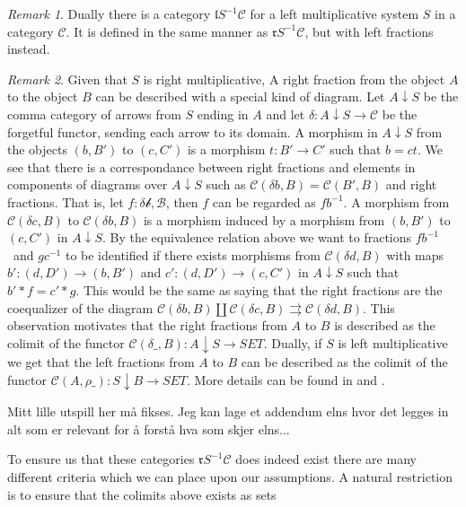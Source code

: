 \documentclass[12pt]{article}
\theoremstyle{definition}
\theoremstyle{remark}
\newtheorem*{remark}{Remark}
\begin{document}
            \begin{remark}
                Dually there is a category $\mathfrak{l}S^{-1}\mathcal{C}$ for a left multiplicative system $S$ in a category $\mathcal{C}$. It is defined in the same manner as $\mathfrak{r}S^{-1}\mathcal{C}$, but with left fractions instead.
            \end{remark}

            \begin{remark}
                Given that $S$ is right multiplicative, A right fraction from the object $A$ to the object $B$ can be described with a special kind of diagram. Let $A\downarrow S$ be the comma category of arrows from $S$ ending in $A$ and let $\delta : A\downarrow S\rightarrow\mathcal{C}$ be the forgetful functor, sending each arrow to its domain. A morphism in $A\downarrow S$ from the objects $(b,B')$ to $(c,C')$ is a morphism $t : B'\rightarrow C'$ such that $b=ct$. We see that there is a correspondance between right fractions and elements in components of diagrams over $A\downarrow S$ such as $\mathcal{C}(\delta b, B)=\mathcal{C}(B',B)$ and right fractions. That is, let $f:\mathcal{\delta b, B}$, then $f$ can be regarded as $fb^{-1}$. A morphism from $\mathcal{C}(\delta c, B)$ to $\mathcal{C}(\delta b, B)$ is a morphism induced by a morphism from $(b,B')$ to $(c,C')$ in $A\downarrow S$. By the equivalence relation above we want to fractions $fb^{-1}$ and $gc^{-1}$ to be identified if there exists morphisms from $\mathcal{C}(\delta d, B)$ with maps $b' : (d,D')\rightarrow (b,B')$ and $c' : (d,D')\rightarrow (c,C')$ in $A\downarrow S$ such that $b'*f = c'*g$. This would be the same as saying that the right fractions are the coequalizer of the diagram $\mathcal{C}(\delta b, B)\coprod \mathcal{C}(\delta c, B)\rightrightarrows \mathcal{C}(\delta d, B)$. This observation motivates that the right fractions from $A$ to $B$ is described as the colimit of the functor $\mathcal{C}(\delta\_, B):A\downarrow S\rightarrow SET$. Dually, if $S$ is left multiplicative we get that the left fractions from $A$ to $B$ can be described as the colimit of the functor $\mathcal{C}(A, \rho\_):S\downarrow B\rightarrow SET$. More details can be found in \cite{zisman} and \cite{weibel}.
            \end{remark}

            Mitt lille utspill her må fikses. Jeg kan lage et addendum elns hvor det legges in alt som er relevant for å forstå hva som skjer elns...

            To ensure us that these categories $\mathfrak{r}S^{-1}\mathcal{C}$ does indeed exist there are many different criteria which we can place upon our assumptions. A natural restriction is to ensure that the colimits above exists as sets
\end{document}
